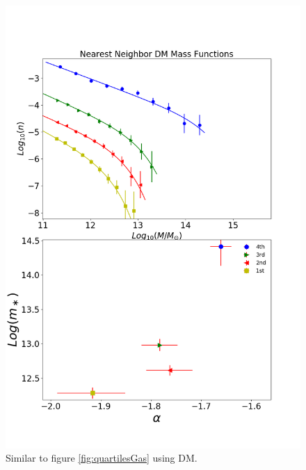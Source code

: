 \documentclass[a4paper,fleqn,usenatbib]{mnras}
\begin{document}
\begin{figure}
	\includegraphics[width=\columnwidth]{./pics/F19_quartilesDM.png}
    \caption{Similar to figure \ref{fig:quartilesGas} using DM.} 
    \label{fig:quartilesDM}
\end{figure}
\end{document}
